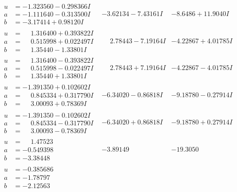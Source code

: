 \documentclass[1p]{elsarticle_modified}
\theoremstyle{definition}
\begin{document}
$$\begin{array}{c|c|c}
\begin{aligned}
u &= -1.323560 - 0.298366 I \\
a &= -1.111640 - 0.313500 I \\
b &= -3.17414 + 0.98120 I\end{aligned}
 & -3.62134 - 7.43161 I & -8.6486 + 11.9040 I \\ \hline\begin{aligned}
u &= \phantom{-}1.316400 + 0.393822 I \\
a &= \phantom{-}0.515998 + 0.022497 I \\
b &= \phantom{-}1.35440 - 1.33801 I\end{aligned}
 & \phantom{-}2.78443 - 7.19164 I & -4.22867 + 4.01785 I \\ \hline\begin{aligned}
u &= \phantom{-}1.316400 - 0.393822 I \\
a &= \phantom{-}0.515998 - 0.022497 I \\
b &= \phantom{-}1.35440 + 1.33801 I\end{aligned}
 & \phantom{-}2.78443 + 7.19164 I & -4.22867 - 4.01785 I \\ \hline\begin{aligned}
u &= -1.391350 + 0.102602 I \\
a &= \phantom{-}0.845334 + 0.317790 I \\
b &= \phantom{-}3.00093 + 0.78369 I\end{aligned}
 & -6.34020 - 0.86818 I & -9.18780 - 0.27914 I \\ \hline\begin{aligned}
u &= -1.391350 - 0.102602 I \\
a &= \phantom{-}0.845334 - 0.317790 I \\
b &= \phantom{-}3.00093 - 0.78369 I\end{aligned}
 & -6.34020 + 0.86818 I & -9.18780 + 0.27914 I \\ \hline\begin{aligned}
u &= \phantom{-}1.47523\phantom{ +0.000000I} \\
a &= -0.549398\phantom{ +0.000000I} \\
b &= -3.38448\phantom{ +0.000000I}\end{aligned}
 & -3.89149\phantom{ +0.000000I} & -19.3050\phantom{ +0.000000I} \\ \hline\begin{aligned}
u &= -0.385686\phantom{ +0.000000I} \\
a &= -1.78797\phantom{ +0.000000I} \\
b &= -2.12563\phantom{ +0.000000I}\end{aligned}

\end{array}$$
\end{document}
